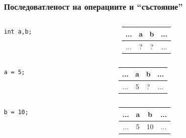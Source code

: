 \documentclass{beamer}
\begin{document}
\begin{frame}[fragile] 
\frametitle{Последоватленост на операциите и ``състояние''}


\begin{columns}[c]
  \begin{column}{0.3\textwidth}
\begin{lstlisting}
int a,b;
\end{lstlisting}

  \end{column}
  \begin{column}{0.7\textwidth}
\begin{tabular}{ c | c | c | c}
\hline
... & a & b &  ...\\\hline
... & ? & ? & ... \\\hline
  
\end{tabular}

  \end{column}
\end{columns}

\pause

\begin{columns}[c]
  \begin{column}{0.3\textwidth}
\begin{lstlisting}
a = 5;
\end{lstlisting}

  \end{column}
  \begin{column}{0.7\textwidth}
\begin{tabular}{ c | c | c | c}
\hline
... & a & b &  ...\\\hline
... & \alert{5} & ? & ... \\\hline
  
\end{tabular}

  \end{column}
\end{columns}

\pause

\begin{columns}[c]
  \begin{column}{0.3\textwidth}
\begin{lstlisting}
b = 10;
\end{lstlisting}

  \end{column}
  \begin{column}{0.7\textwidth}
\begin{tabular}{ c | c | c | c}
\hline
... & a & b &  ...\\\hline
... & 5 & \alert{10} & ... \\\hline
  

\end{tabular}
\end{column}
\end{columns}
\end{frame}
\end{document}
